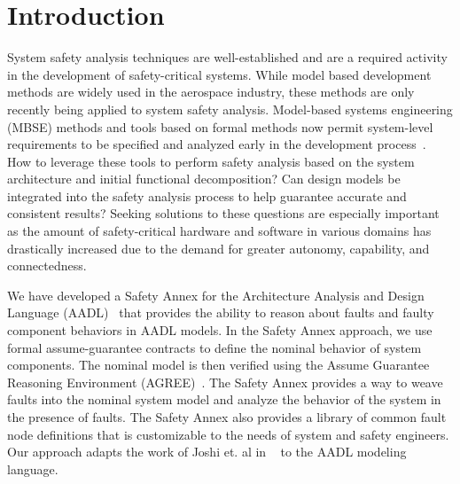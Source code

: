 \section{Introduction}
\label{sec:intro}


System safety analysis techniques are well-established and are a required activity in the development of safety-critical systems. While model based development methods are widely used in the aerospace industry, these methods are only recently being applied to system safety analysis. Model-based systems engineering (MBSE) methods and tools based on formal methods now permit system-level requirements to be specified and analyzed early in the development process~\cite{NFM2012:CoGaMiWhLaLu,CAV2015:BoCiGrMa}. How to leverage these tools to perform safety analysis based on the system architecture and initial functional decomposition? Can design models be integrated into the safety analysis process to help guarantee accurate and consistent results? Seeking solutions to these questions are especially important as the amount of safety-critical hardware and software in various domains has drastically increased due to the demand for greater autonomy, capability, and connectedness. 

We have developed a Safety Annex for the Architecture Analysis and Design Language (AADL)~\cite{FeilerModelBasedEngineering2012} that provides the ability to reason about faults and faulty component behaviors in AADL models. In the Safety Annex approach, we use formal assume-guarantee contracts to define the nominal behavior of system components. The nominal model is then verified using the Assume Guarantee Reasoning Environment (AGREE)~\cite{NFM2012:CoGaMiWhLaLu}. The Safety Annex  provides a way to weave faults into the nominal system model and analyze the behavior of the system in the presence of faults. The Safety Annex also provides a library of common fault node definitions that is customizable to the needs of system and safety engineers. Our approach adapts the work of Joshi et. al in
~\cite{Joshi05:Dasc} to the AADL modeling language.  %


